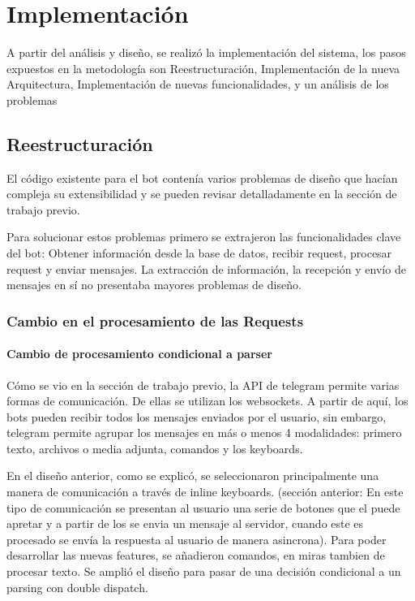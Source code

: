 \chapter{Implementación}\label{sec:imple}
    \par A partir del análisis y diseño, se realizó la implementación del sistema, los pasos expuestos en la metodología son Reestructuración, Implementación de la nueva Arquitectura, Implementación de nuevas funcionalidades, y un análisis de los problemas

\section{Reestructuración}\label{imp:refactoring}

    El código existente para el bot contenía varios problemas de diseño que hacían compleja su extensibilidad y se pueden revisar detalladamente en la sección de trabajo previo.

    \par Para solucionar estos problemas primero se extrajeron las funcionalidades clave del bot: Obtener información desde la base de datos, recibir request, procesar request y enviar mensajes. La extracción de información, la recepción y envío de mensajes en sí no presentaba mayores problemas de diseño. 

    \subsection{Cambio en el procesamiento de las Requests}

    \subsubsection{Cambio de procesamiento condicional a parser}
    
        \par Cómo se vio en la sección de trabajo previo, la API de telegram permite varias formas de comunicación. De ellas se utilizan los websockets. A partir de aquí, los bots pueden recibir todos los mensajes enviados por el usuario, sin embargo, telegram permite agrupar los mensajes en más o menos 4 modalidades: primero texto, archivos o media adjunta, comandos y los keyboards.

        \par En el diseño anterior, como se explicó, se seleccionaron principalmente una manera de comunicación  a través de inline keyboards. (sección anterior: En este tipo de comunicación se presentan al usuario una serie de botones que el puede apretar y a partir de los se envia un mensaje al servidor, cuando este es procesado se envía la respuesta al usuario de manera asincrona). Para poder desarrollar las nuevas features, se añadieron comandos, en miras tambien de procesar texto. Se amplió el diseño para pasar de una decisión condicional a un parsing con double dispatch.

